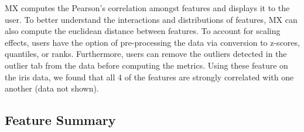 \documentclass[12pt]{article}
\begin{document}
MX computes the Pearson's correlation amongst features and displays it to the user. To better understand the interactions and distributions of features, MX can also compute the euclidean distance between features. To account for scaling effects, users have the option of pre-processing the data via conversion to z-scores, quantiles, or ranks. Furthermore, users can remove the outliers detected in the outlier tab from the data before computing the metrics. Using these feature on the iris data, we found that all 4 of the features are strongly correlated with one another (data not shown).

\subsection{Feature Summary}
\label{subsec:SubSecFeature}
\end{document}
